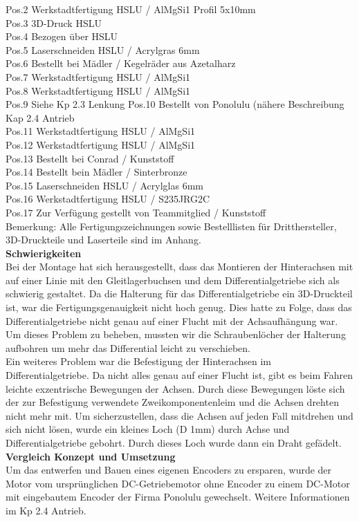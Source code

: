 Pos.2 	Werkstadtfertigung HSLU / AlMgSi1 Profil 5x10mm\\
Pos.3 	3D-Druck HSLU\\
Pos.4 	Bezogen über HSLU\\
Pos.5 	Laserschneiden HSLU / Acrylgras 6mm\\
Pos.6 	Bestellt bei Mädler / Kegelräder aus Azetalharz\\
Pos.7 	Werkstadtfertigung HSLU / AlMgSi1\\
Pos.8	Werkstadtfertigung HSLU / AlMgSi1\\
Pos.9 	Siehe Kp 2.3 Lenkung
Pos.10	Bestellt von Ponolulu (nähere Beschreibung Kap 2.4 Antrieb\\
Pos.11	Werkstadtfertigung HSLU / AlMgSi1\\
Pos.12	Werkstadtfertigung HSLU / AlMgSi1\\
Pos.13	Bestellt bei Conrad / Kunststoff\\
Pos.14	Bestellt bein Mädler / Sinterbronze\\
Pos.15	Laserschneiden HSLU / Acrylglas 6mm\\
Pos.16	Werkstadtfertigung HSLU / S235JRG2C\\
Pos.17	Zur Verfügung gestellt von Teammitglied / Kunststoff\\[0.2cm]
Bemerkung: Alle Fertigungszeichnungen sowie Bestelllisten für Dritthersteller, 3D-Druckteile und Laserteile sind im Anhang.\\
\textbf{Schwierigkeiten}\\[0.2cm]
Bei der Montage hat sich herausgestellt, dass das Montieren der Hinterachsen mit auf einer Linie mit den Gleitlagerbuchsen und dem Differentialgetriebe sich als schwierig gestaltet. Da die Halterung für das Differentialgetriebe ein 3D-Druckteil ist, war die Fertigungsgenauigkeit nicht hoch genug. Dies hatte zu Folge, dass das Differentialgetriebe nicht genau auf einer Flucht mit der Achsaufhängung war. Um dieses Problem zu beheben, mussten wir die Schraubenlöcher der Halterung aufbohren um mehr das Differential leicht zu verschieben.\\
Ein weiteres Problem war die Befestigung der Hinterachsen im Differentialgetriebe. Da nicht alles genau auf einer Flucht ist, gibt es beim Fahren leichte exzentrische Bewegungen der Achsen. Durch diese Bewegungen löste sich der zur Befestigung verwendete Zweikomponentenleim und die Achsen drehten nicht mehr mit. Um sicherzustellen, dass die Achsen auf jeden Fall mitdrehen und sich nicht lösen, wurde ein kleines Loch (D 1mm) durch Achse und Differentialgetriebe gebohrt. Durch dieses Loch wurde dann ein Draht gefädelt.\\[0.2cm] 
\textbf{Vergleich Konzept und Umsetzung}\\[0.2cm]
Um das entwerfen und Bauen eines eigenen Encoders zu ersparen, wurde der Motor vom ursprünglichen DC-Getriebemotor ohne Encoder zu einem DC-Motor mit eingebautem Encoder der Firma Ponolulu gewechselt. Weitere Informationen im Kp 2.4 Antrieb.
